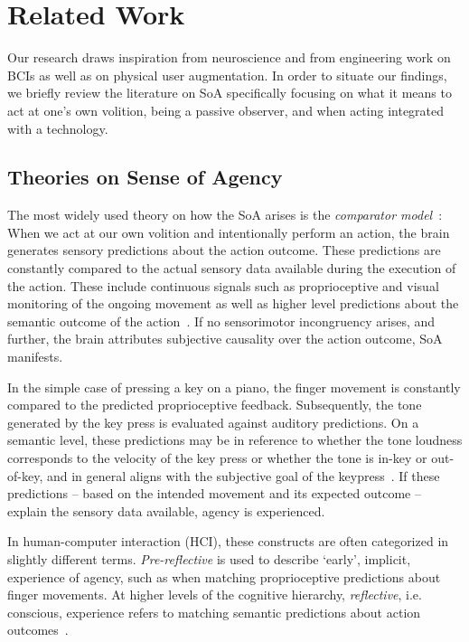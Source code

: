 \section{Related Work}
Our research draws inspiration from neuroscience and from engineering work on BCIs as well as on physical user augmentation. In order to situate our findings, we briefly review the literature on SoA specifically focusing on what it means to act at one's own volition, being a passive observer, and when acting integrated with a technology.

\subsection{Theories on Sense of Agency}
The most widely used theory on how the SoA arises is the \textit{comparator model}~\cite{Blakemore2002-dj, Frith2000-ch, Frith2006-sc}: When we act at our own volition and intentionally perform an action, the brain generates sensory predictions about the action outcome. These predictions are constantly compared to the actual sensory data available during the execution of the action. These include continuous signals such as proprioceptive and visual monitoring of the ongoing movement as well as higher level predictions about the semantic outcome of the action~\cite{Clark2013-ah, Haggard2003-ff, Haggard2017-uv}. If no sensorimotor incongruency arises, and further, the brain attributes subjective causality over the action outcome, SoA manifests. 

In the simple case of pressing a key on a piano, the finger movement is constantly compared to the predicted proprioceptive feedback. Subsequently, the tone generated by the key press is evaluated against auditory predictions. On a semantic level, these predictions may be in reference to whether the tone loudness corresponds to the velocity of the key press or whether the tone is in-key or out-of-key, and in general aligns with the subjective goal of the keypress~\cite{Pangratz2023-ew}. If these predictions -- based on the intended movement and its expected outcome -- explain the sensory data available, agency is experienced.

In human-computer interaction (HCI), these constructs are often categorized in slightly different terms. \textit{Pre-reflective} is used to describe `early', implicit, experience of agency, such as when matching proprioceptive predictions about finger movements. At higher levels of the cognitive hierarchy, \textit{reflective}, i.e. conscious, experience refers to matching semantic predictions about action outcomes~\cite{Danry2022-xk, Cornelio2022-aq}. 

